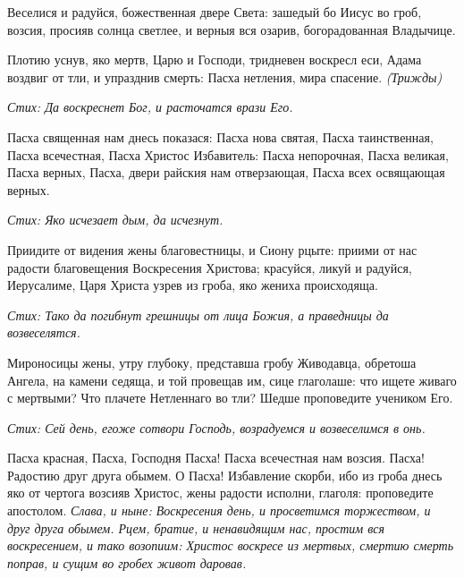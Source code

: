 Веселися и радуйся, божественная двере Света: зашедый бо Иисус во гроб, возсия, просияв солнца светлее, и верныя вся озарив, богорадованная Владычице. 


Плотию уснув, яко мертв, Царю и Господи, тридневен воскресл еси, Адама воздвиг от тли, и упразднив смерть: Пасха нетления, мира спасение. \itshape (Трижд\normalfont{}ы) 


\itshape Стих\normalfont{}: Да воскреснет Бог, и расточатся врази Его. 





Пасха священная нам днесь показася: Пасха нова святая, Пасха таинственная, Пасха всечестная, Пасха Христос Избавитель: Пасха непорочная, Пасха великая, Пасха верных, Пасха, двери райския нам отверзающая, Пасха всех освящающая верных. 

\itshape Стих\normalfont{}: Яко исчезает дым, да исчезнут. 





Приидите от видения жены благовестницы, и Сиону рцыте: приими от нас радости благовещения Воскресения Христова; красуйся, ликуй и радуйся, Иерусалиме, Царя Христа узрев из гроба, яко жениха происходяща. 

\itshape Стих\normalfont{}: Тако да погибнут грешницы от лица Божия, а праведницы да возвеселятся. 





Мироносицы жены, утру глубоку, представша гробу Живодавца, обретоша Ангела, на камени седяща, и той провещав им, сице глаголаше: что ищете живаго с мертвыми? Что плачете Нетленнаго во тли? Шедше проповедите учеником Его. 

\itshape Стих\normalfont{}: Сей день, егоже сотвори Господь, возрадуемся и возвеселимся в онь. 





Пасха красная, Пасха, Господня Пасха! Пасха всечестная нам возсия. Пасха! Радостию друг друга обымем. О Пасха! Избавление скорби, ибо из гроба днесь яко от чертога возсияв Христос, жены радости исполни, глаголя: проповедите апостолом. \itshape \normalfont{}
\itshape Слава, и ныне\normalfont{}: Воскресения день, и просветимся торжеством, и друг друга обымем. Рцем, братие, и ненавидящим нас, простим вся воскресением, и тако возопиим: Христос воскресе из мертвых, смертию смерть поправ, и сущим во гробех живот даровав. 
\mychapterending

